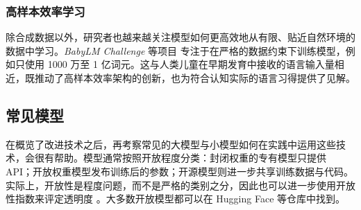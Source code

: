 \subsubsection{高样本效率学习}
除合成数据以外，研究者也越来越关注模型如何更高效地从有限、贴近自然环境的数据中学习。\emph{BabyLM Challenge} 等项目 \citep{warstadt-etal-2023-findings} 专注于在严格的数据约束下训练模型，例如只使用 1000 万至 1 亿词元。这与人类儿童在早期发育中接收的语言输入量相近，既推动了高样本效率架构的创新，也为符合认知实际的语言习得提供了见解。

\subsection{常见模型}
在概览了改进技术之后，再考察常见的大模型与小模型如何在实践中运用这些技术，会很有帮助。模型通常按照开放程度分类：封闭权重的专有模型只提供 API；开放权重模型发布训练后的参数；开源模型则进一步共享训练数据与代码。实际上，开放性是程度问题，而不是严格的类别之分，因此也可以进一步使用开放性指数来评定透明度 \citep{artificialanalysis_openness}。大多数开放模型都可以在 Hugging Face 等仓库中找到。

